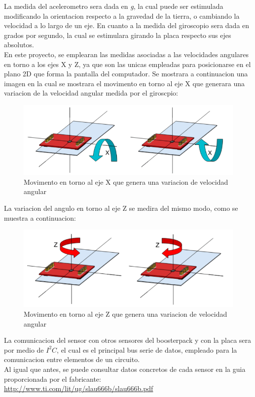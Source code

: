 \documentclass[a4paper,twoside]{article}
\begin{document}
La medida del acelerometro sera dada en \textit{g}, la cual puede ser estimulada modificando la orientacion respecto a la gravedad de la tierra, o cambiando la velocidad a lo largo de un eje. En cuanto a la medida del giroscopio sera dada en grados por segundo, la cual se estimulara girando la placa respecto sus ejes absolutos. \\
En este proyecto, se emplearan las medidas asociadas a las velocidades angulares en torno a los ejes X y Z, ya que son las unicas empleadas para posicionarse en el plano 2D que forma la pantalla del computador. Se mostrara a continuacion una imagen en la cual se mostrara el movimento en torno al eje X que generara una variacion de la velocidad angular medida por el giroscpio:\\
\begin{figure}[h!]
 \centering
 \includegraphics[width=.6\textwidth]{../images/mov_axisX_bmi}
 \caption{Movimento en torno al eje X que genera una variacion de velocidad angular}
\end{figure}

La variacion del angulo en torno al eje Z se medira del mismo modo, como se muestra a continuacion: \\
\begin{figure}[h!]
 \centering
 \includegraphics[width=.6\textwidth]{../images/mov_axisZ_bmi}
 \caption{Movimento en torno al eje Z que genera una variacion de velocidad angular}
\end{figure}

\newpage
La comunicacion del sensor con otros sensores del boosterpack y con la placa sera por medio de $I^2C$, el cual es el principal bus serie de datos, empleado para la comunicacion entre elementos de un circuito. \\


Al igual que antes, se puede consultar datos concretos de cada sensor en la guia proporcionada por el fabricante:
\url{http://www.ti.com/lit/ug/slau666b/slau666b.pdf}
\end{document}

